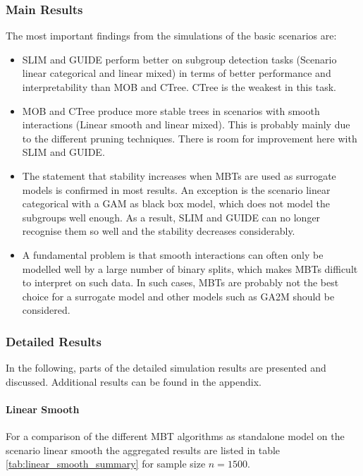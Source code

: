 \subsubsection{Main Results}
The most important findings from the simulations of the basic scenarios are:
\begin{itemize}
    \item SLIM and GUIDE perform better on subgroup detection tasks (Scenario linear categorical and linear mixed) in terms of better performance and interpretability than MOB and CTree. CTree is the weakest in this task.
    \item MOB and CTree produce more stable trees in scenarios with smooth interactions (Linear smooth and linear mixed). This is probably mainly due to the different pruning techniques. There is room for improvement here with SLIM and GUIDE.
    \item The statement that stability increases when MBTs are used as surrogate models is confirmed in most results. An exception is the scenario linear categorical with a GAM as black box model, which does not model the subgroups well enough. As a result, SLIM and GUIDE can no longer recognise them so well and the stability decreases considerably.
    \item A fundamental problem is that smooth interactions can often only be modelled well by a large number of binary splits, which makes MBTs difficult to interpret on such data. In such cases, MBTs are probably not the best choice for a surrogate model and other models such as GA2M \citep{Lou.2013} should be considered.

\end{itemize}


\subsubsection{Detailed Results}
In the following, parts of the detailed simulation results are presented and discussed. Additional results can be found in the appendix.

\paragraph{Linear Smooth}
For a comparison of the different MBT algorithms as standalone model on the scenario linear smooth the aggregated results are listed in table \ref{tab:linear_smooth_summary} for sample size $n = 1500$. 


